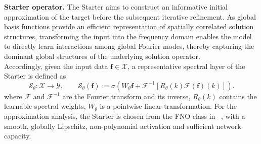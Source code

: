 \documentclass[preprint,numbers,sort&compress]{elsarticle}
\begin{document}
		\textbf{Starter operator.} The Starter aims to construct an informative initial approximation of the target before the subsequent iterative refinement. 
		As global basis functions provide an efficient representation of spatially correlated solution structures,  transforming the input into the frequency domain enables the model to directly learn interactions among global Fourier modes, thereby capturing the dominant global structures of the underlying solution operator. \\
		Accordingly, given the input data $\boldsymbol f\in\mathcal X$, a representative spectral layer of the Starter is defined as
		\begin{equation*}
			\mathcal{S}_{\theta} : \mathcal{X}
			\rightarrow \mathcal{Y}, \qquad \mathcal{S}_{\theta} (\boldsymbol f) :=
			\sigma\!\left(
			W_\theta\boldsymbol f
			+\mathcal F^{-1}
			\left[R_\theta(k)\mathcal F(\boldsymbol f)(k)\right]
			\right).
		\end{equation*}
		where $\mathcal F$ and $\mathcal F^{-1}$ are the Fourier transform
		and its inverse, $R_\theta(k)$ contains the learnable spectral
		weights, $W_\theta$ is a pointwise linear transformation. 
		For the approximation analysis, the Starter is chosen from the
		FNO class in ~\cite{kovachki2021universal}, with a smooth, globally Lipschitz,
		non-polynomial activation and sufficient network capacity.
		
\end{document}
